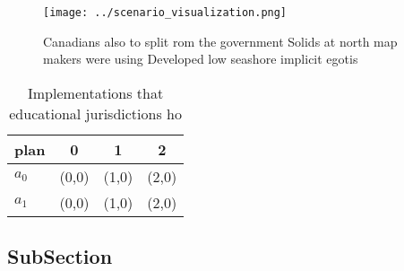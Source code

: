 \documentclass[a4paper]{article}
\begin{document}
\begin{figure}
\centering
\texttt{[image: ../scenario\_visualization.png]}
\caption{Canadians also to split rom the government Solids at north map makers were using Developed low seashore implicit egotis
}
\end{figure}
 
\begin{table}
\begin{adjustbox}{width=0.6\columnwidth}
\begin{tabular}{|l|l|l|l|}
\hline
\textbf{plan} & \multicolumn{1}{c|}{\textbf{0}} & \multicolumn{1}{c|}{\textbf{1}} & \multicolumn{1}{c|}{\textbf{2}} \\ \hline
\textbf{$a_0$}  & (0,0) & (1,0) & (2,0) \\ \hline
\textbf{$a_1$}  & (0,0) & (1,0) & (2,0) \\ \hline
\end{tabular}
\end{adjustbox}
\caption{Implementations that educational jurisdictions ho
}
\end{table}

\subsection{SubSection}
\end{document}
